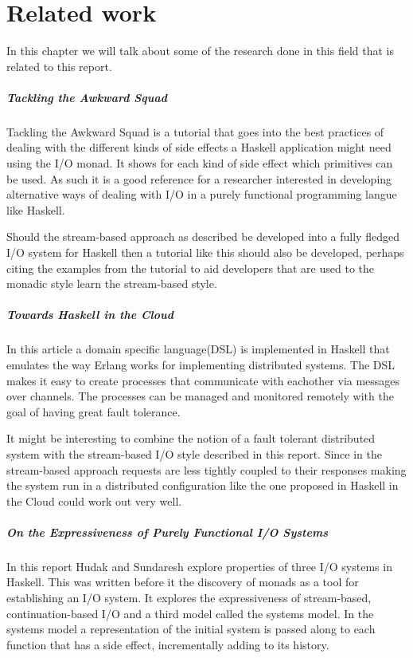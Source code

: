 \chapter{Related work}

In this chapter we will talk about some of the research done in this field that is related to this report.

\paragraph{Tackling the Awkward Squad\cite{Jones02tacklingthe}}
Tackling the Awkward Squad is a tutorial that goes into the best practices of dealing with the different kinds of side effects a Haskell application might need using the I/O monad. It shows for each kind of side effect which primitives can be used. As such it is a good reference for a researcher interested in developing alternative ways of dealing with I/O in a purely functional programming langue like Haskell.

Should the stream-based approach as described be developed into a fully fledged I/O system for Haskell then a tutorial like this should also be developed, perhaps citing the examples from the tutorial to aid developers that are used to the monadic style learn the stream-based style.

\paragraph{Towards Haskell in the Cloud\cite{epstein_haskell_????}}
In this article a domain specific language(DSL) is implemented in Haskell that emulates the way Erlang works for implementing distributed systems. The DSL makes it easy to create processes that communicate with eachother via messages over channels. The processes can be managed and monitored remotely with the goal of having great fault tolerance. 

It might be interesting to combine the notion of a fault tolerant distributed system with the stream-based I/O style described in this report. Since in the stream-based approach requests are less tightly coupled to their responses making the system run in a distributed configuration like the one proposed in Haskell in the Cloud could work out very well.

\paragraph{On the Expressiveness of Purely Functional I/O Systems\cite{Hudak89onthe}}
In this report Hudak and Sundaresh explore properties of three I/O systems in Haskell.
This was written before it the discovery of monads as a tool for establishing an I/O system.
It explores the expressiveness of stream-based, continuation-based I/O and a third model called the systems model. In the systems model a representation of the initial system is passed along to each function that has a side effect, incrementally adding to its history. 

